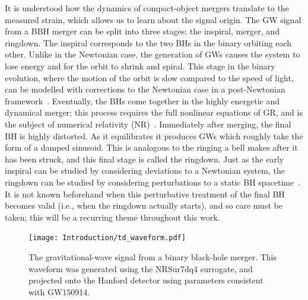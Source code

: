 It is understood how the dynamics of compact-object mergers translate to the measured strain, which allows us to learn about the signal origin.
The GW signal from a BBH merger can be split into three stages: the inspiral, merger, and ringdown.
The inspiral corresponds to the two BHs in the binary orbiting each other. 
Unlike in the Newtonian case, the generation of GWs causes the system to lose energy and for the orbit to shrink and spiral. 
This stage in the binary evolution, where the motion of the orbit is slow compared to the speed of light, can be modelled with corrections to the Newtonian case in a post-Newtonian framework~\cite{Blanchet:2013haa}. 
Eventually, the BHs come together in the highly energetic and dynamical merger; this process requires the full nonlinear equations of GR, and is the subject of numerical relativity (NR)~\cite{Duez:2018jaf}. 
Immediately after merging, the final BH is highly distorted. 
As it equilibrates it produces GWs which roughly take the form of a damped sinusoid. 
This is analogous to the ringing a bell makes after it has been struck, and this final stage is called the ringdown.
Just as the early inspiral can be studied by considering deviations to a Newtonian system, the ringdown can be studied by considering perturbations to a static BH spacetime~\cite{Sasaki:2003xr, Pound:2021qin}. 
It is not known beforehand when this perturbative treatment of the final BH becomes valid (i.e., when the ringdown actually starts), and so care must be taken; this will be a recurring theme throughout this work.

\begin{figure}[t]
	\centering
	\texttt{[image: Introduction/td\_waveform.pdf]}
	\caption[The time-domain gravitational-wave signal from a binary black-hole merger]{ 
		The gravitational-wave signal from a binary black-hole merger. This waveform was generated using the NRSur7dq4 surrogate, and projected onto the Hanford detector using parameters consistent with GW150914.}
	\label{fig:ch1:td_waveform}
\end{figure}

